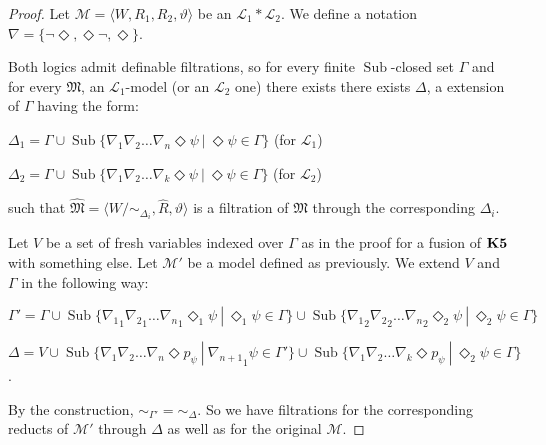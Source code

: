 \documentclass[a4paper]{article}
\theoremstyle{defin}
\theoremstyle{theorem}
\theoremstyle{prop}
\theoremstyle{lemma}
\theoremstyle{fact}
\theoremstyle{ex}
\theoremstyle{col}
\theoremstyle{claim}
\begin{document}
\begin{proof}
  Let $\mathcal{M} = \langle W, R_1, R_2, \vartheta \rangle$ be an $\mathcal{L}_1 * \mathcal{L}_2$.
  We define a notation $\nabla = \{ \neg \Diamond, \Diamond \neg, \Diamond \}$.

  Both logics admit definable filtrations, so for every finite $\operatorname{Sub}$-closed set $\Gamma$ and for every $\mathfrak{M}$, an $\mathcal{L}_1$-model (or an $\mathcal{L}_2$ one) there exists there exists $\Delta$, a extension of $\Gamma$ having the form:
  \begin{center}
    $\Delta_1 = \Gamma \cup \operatorname{Sub}\{ \nabla_1 \nabla_2 \dots \nabla_n \Diamond \psi \: | \: \Diamond \psi \in \Gamma \}$ (for $\mathcal{L}_1$)

    $\Delta_2 = \Gamma \cup \operatorname{Sub}\{ \nabla_1 \nabla_2 \dots \nabla_k \Diamond \psi \: | \: \Diamond \psi \in \Gamma \}$ (for $\mathcal{L}_2$)
  \end{center}
  such that $\widehat{\mathfrak{M}} = \langle W / \sim_{\Delta_i}, \widehat{R}, \vartheta \rangle$ is a filtration of $\mathfrak{M}$ through the corresponding $\Delta_i$.

  Let $V$ be a set of fresh variables indexed over $\Gamma$ as in the proof for a fusion of ${\bf K5}$ with something else. Let $\mathcal{M}'$ be a model defined as previously. We extend $V$ and $\Gamma$ in the following way:

\begin{center}
  $\Gamma' = \Gamma \cup \operatorname{Sub}\{ {\nabla_1}_1 {\nabla_2}_1 \dots {\nabla_n}_1 \Diamond_1 \psi \: | \: \Diamond_1 \psi \in \Gamma \} \cup \operatorname{Sub}\{ {\nabla_1}_2 {\nabla_2}_2 \dots {\nabla_n}_2 \Diamond_2 \psi \: | \: \Diamond_2 \psi \in \Gamma \}$

  $\Delta = V \cup \operatorname{Sub}\{ \nabla_1 \nabla_2 \dots \nabla_n \Diamond p_{\psi} \: | \: {\nabla_{n + 1}}_1 \psi \in \Gamma' \} \cup \operatorname{Sub}\{ \nabla_1 \nabla_2 \dots \nabla_k \Diamond p_{\psi} \: | \: \Diamond_2 \psi \in \Gamma \}$.
\end{center}
By the construction, $\sim_{\Gamma'} = \sim_{\Delta}$. So we have filtrations for the corresponding reducts of $\mathcal{M}'$ through $\Delta$ as well as for the original $\mathcal{M}$.
\end{proof}



\end{document}
